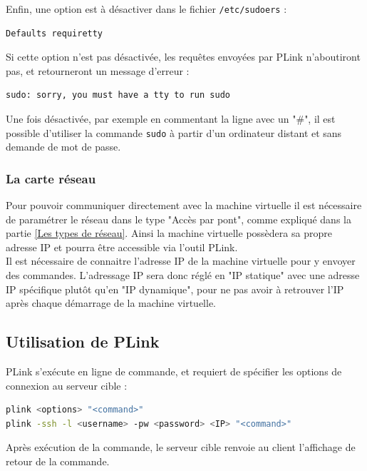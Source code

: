Enfin, une option est à désactiver dans le fichier \lstinline{/etc/sudoers} :
\begin{lstlisting}
Defaults requiretty
\end{lstlisting}
Si cette option n'est pas désactivée, les requêtes envoyées par PLink n'aboutiront pas, et retourneront un message d'erreur :
\begin{lstlisting}
sudo: sorry, you must have a tty to run sudo
\end{lstlisting}
Une fois désactivée, par exemple en commentant la ligne avec un "\#", il est possible d'utiliser la commande \lstinline{sudo} à partir d'un ordinateur distant et sans demande de mot de passe.
\\




\subsubsection{La carte réseau}

Pour pouvoir communiquer directement avec la machine virtuelle il est nécessaire de paramétrer le réseau dans le type "Accès par pont", comme expliqué dans la partie \ref{Les types de réseau}.
Ainsi la machine virtuelle possèdera sa propre adresse IP et pourra être accessible via l'outil PLink.
\\


Il est nécessaire de connaitre l'adresse IP de la machine virtuelle pour y envoyer des commandes.
L'adressage IP sera donc réglé en "IP statique" avec une adresse IP spécifique plutôt qu'en "IP dynamique", pour ne pas avoir à retrouver l'IP après chaque démarrage de la machine virtuelle.
\\





\subsection{Utilisation de PLink}
\label{Utilisation de PLink}

PLink s'exécute en ligne de commande, et requiert de spécifier les options de connexion au serveur cible :
\begin{lstlisting}[language = sh]
plink <options> "<command>"
plink -ssh -l <username> -pw <password> <IP> "<command>"
\end{lstlisting}
Après exécution de la commande, le serveur cible renvoie au client l'affichage de retour de la commande.
\\


